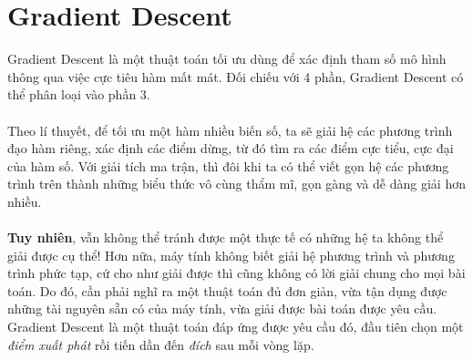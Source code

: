 \documentclass{article}
\begin{document}
\section{Gradient Descent}
Gradient Descent là một thuật toán tối ưu dùng để xác định tham số mô hình thông qua việc cực tiêu hàm mất mát. Đối chiếu với 4 phần, Gradient Descent có thể phân loại vào phần 3.\\\\
Theo lí thuyết, để tối ưu một hàm nhiều biến số, ta sẽ giải hệ các phương trình đạo hàm riêng, xác định các điểm dừng, từ đó tìm ra các điểm cực tiểu, cực đại của hàm số. Với giải tích ma trận, thì đôi khi ta có thể viết gọn hệ các phương trình trên thành những biểu thức vô cùng thẩm mĩ, gọn gàng và dễ dàng giải hơn nhiều. \\\\\textbf{Tuy nhiên}, vẫn không thể tránh được một thực tế có những hệ ta không thể giải được cụ thể! Hơn nữa, máy tính không biết giải hệ phương trình và phương trình phức tạp, cứ cho như giải được thì cũng không có lời giải chung cho mọi bài toán. Do đó, cần phải nghĩ ra một thuật toán đủ đơn giản, vừa tận dụng được những tài nguyên sẵn có của máy tính, vừa giải được bài toán được yêu cầu. Gradient Descent là một thuật toán đáp ứng được yêu cầu đó, đầu tiên chọn một \textit{điểm xuất phát} rồi tiến dần đến \textit{đích} sau mỗi vòng lặp.
\end{document}
